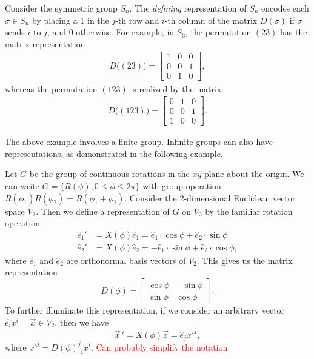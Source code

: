 \begin{example}
    Consider the symmetric group $S_n$. The \textit{defining} representation of $S_n$ encodes each $\sigma\in S_n$ by placing a 1 in the $j$-th row and $i$-th column of the matrix $D(\sigma)$ if $\sigma$ sends $i$ to $j$, and 0 otherwise. For example, in $S_3$, the permutation $(23)$ has the matrix representation
    \begin{align*}
        D\big((23)\big) = \begin{bmatrix} 1 & 0 & 0 \\ 0 & 0 & 1 \\ 0 & 1 & 0 \end{bmatrix},
    \end{align*}
    whereas the permutation $(123)$ is realized by the matrix
    \begin{align*}
        D\big((123)\big) = \begin{bmatrix} 0 & 1 & 0 \\ 0 & 0 & 1 \\ 1 & 0 & 0 \end{bmatrix}.
    \end{align*}
\end{example}

The above example involves a finite group. Infinite groups can also have representations, as demonstrated in the following example.
\begin{example}
    Let $G$ be the group of continuous rotations in the $xy$-plane about the origin. We can write $G = \{R(\phi),0\leq\phi\leq2\pi\}$ with group operation $R(\phi_1)R(\phi_2) = R(\phi_1+\phi_2)$. Consider the 2-dimensional Euclidean vector space $V_2$. Then we define a representation of $G$ on $V_2$ by the familiar rotation operation
    \begin{align}
        \hat{e}_1' &= X(\phi)\hat{e}_1 = \hat{e}_1\cdot\cos\phi + \hat{e}_2\cdot\sin\phi\\
        \hat{e}_2' &= X(\phi)\hat{e}_2 = -\hat{e}_1\cdot\sin\phi + \hat{e}_2\cdot\cos\phi,
    \end{align}
    where $\hat{e}_1$ and $\hat{e}_2$ are orthonormal basis vectors of $V_2$. This gives us the matrix representation
    \begin{equation}
        D(\phi) = \begin{bmatrix}
            \cos\phi & -\sin\phi\\
            \sin\phi & \cos\phi
        \end{bmatrix}.
    \end{equation}
    To further illuminate this representation, if we consider an arbitrary vector $\hat{e_i}x^i=\vec{x}\in V_2$, then we have
    \begin{equation}
        \vec{x}\,' = X(\phi)\vec{x} = \hat{e}_j{x'}^j,
    \end{equation}
    where ${x'}^j = {{D(\phi)}^j}_i x^i$.
    \textcolor{red}{Can probably simplify the notation}
\end{example}

